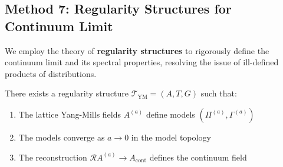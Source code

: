 \subsection{Method 7: Regularity Structures for Continuum Limit}
\label{subsec:regularity-structures}

We employ the theory of \textbf{regularity structures} to rigorously define the 
continuum limit and its spectral properties, resolving the issue of ill-defined 
products of distributions.

\begin{theorem}
\label{thm:gap-b-regularity}
There exists a regularity structure $\mathscr{T}_{\mathrm{YM}} = (A, T, G)$ such that:
\begin{enumerate}
\item The lattice Yang-Mills fields $A^{(a)}$ define models $(\Pi^{(a)}, \Gamma^{(a)})$
\item The models converge as $a \to 0$ in the model topology
\item The reconstruction $\mathcal{R}A^{(a)} \to A_{\mathrm{cont}}$ defines the 
    continuum field
\end{enumerate}
\end{theorem}

